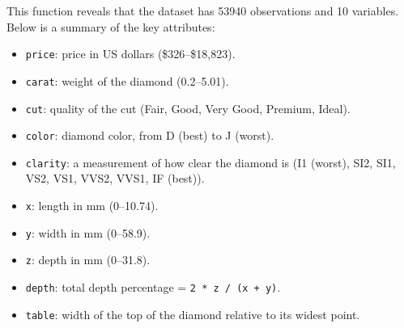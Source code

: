 \documentclass[
  11pt,
]{book}
\makeatletter
\newenvironment{Shaded}{}{}
\newcommand{\DecValTok}[1]{#1}
\newcommand{\FloatTok}[1]{#1}
\newcommand{\NormalTok}[1]{#1}
\newcommand{\SpecialCharTok}[1]{\textcolor[rgb]{0.39,0.39,0.39}{#1}}
\providecommand{\tightlist}{%
  \setlength{\itemsep}{0pt}\setlength{\parskip}{0pt}}
\newenvironment{kframe}{%
\medskip{}
\setlength{\fboxsep}{.8em}
 \def\at@end@of@kframe{}%
 \ifinner\ifhmode%
  \def\at@end@of@kframe{\end{minipage}}%
  \begin{minipage}{\columnwidth}%
 \fi\fi%
 \def\FrameCommand##1{\hskip\@totalleftmargin \hskip-\fboxsep
 \colorbox{shadecolor}{##1}\hskip-\fboxsep
     \hskip-\linewidth \hskip-\@totalleftmargin \hskip\columnwidth}%
 \MakeFramed {\advance\hsize-\width
   \@totalleftmargin\z@ \linewidth\hsize
   \@setminipage}}%
 {\par\unskip\endMakeFramed%
 \at@end@of@kframe}
\renewenvironment{Shaded}{\begin{kframe}}{\end{kframe}}
\theoremstyle{definition}
\theoremstyle{definition}
\theoremstyle{definition}
\theoremstyle{definition}
\theoremstyle{remark}
\makeatother
\begin{document}
\begin{Shaded}
\end{Shaded}

This function reveals that the dataset has 53940 observations and 10 variables. Below is a summary of the key attributes:

\begin{itemize}
\tightlist
\item
  \texttt{price}: price in US dollars (\$326--\$18,823).
\item
  \texttt{carat}: weight of the diamond (0.2--5.01).
\item
  \texttt{cut}: quality of the cut (Fair, Good, Very Good, Premium, Ideal).
\item
  \texttt{color}: diamond color, from D (best) to J (worst).
\item
  \texttt{clarity}: a measurement of how clear the diamond is (I1 (worst), SI2, SI1, VS2, VS1, VVS2, VVS1, IF (best)).
\item
  \texttt{x}: length in mm (0--10.74).
\item
  \texttt{y}: width in mm (0--58.9).
\item
  \texttt{z}: depth in mm (0--31.8).
\item
  \texttt{depth}: total depth percentage = \texttt{2\ *\ z\ /\ (x\ +\ y)}.
\item
  \texttt{table}: width of the top of the diamond relative to its widest point.
\end{itemize}
\end{document}
